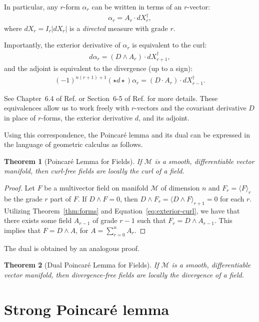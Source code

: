 \documentclass[twocolumn,notitlepage,nofootinbib,tightenlines]{revtex4-1}
\newtheorem{thm}{Theorem}[section]
\theoremstyle{definition}
\theoremstyle{remark}
\numberwithin{equation}{section}
\begin{document}
In particular, any $r$-form $\alpha_r$ can be written in terms of an $r$-vector:
%
\begin{align}\label{eq:form-field}
    \alpha_r = A_r \cdot dX_r^\dagger,
\end{align}
%
where $dX_r = I_r |dX_r|$ is a \emph{directed} measure with grade $r$.

Importantly, the exterior derivative of $\alpha_r$ is equivalent to the curl:
%
\begin{align}\label{eq:exterior-curl}
    d \alpha_r = (D \wedge A_r) \cdot dX_{r+1}^\dagger,
\end{align}
%
and the adjoint is equivalent to the divergence (up to a sign):
%
\begin{align}\label{eq:adjoint-divergence}
    (-1)^{n(r+1)+1}(\star d \star) \alpha_r = (D \cdot A_r) \cdot dX_{r-1}^\dagger.
\end{align}

See Chapter~6.4 of Ref. \cite{doran} or Section~6-5 of Ref. \cite{hestenes} for more details. These equivalences allow us to work freely with $r$-vectors and the covariant derivative $D$ in place of $r$-forms, the exterior derivative $d$, and its adjoint.

Using this correspondence, the Poincar\'e lemma and its dual can be expressed in the language of geometric calculus as follows.
%
\begin{thm}[Poincar\'e Lemma for Fields]\label{thm:fields}
    If $\mathcal{M}$ is a smooth, differentiable vector manifold, then curl-free fields are locally the curl of a field.
\end{thm}
%
\begin{proof}
  Let $F$ be a multivector field on manifold $\mathcal{M}$ of dimension $n$ and $F_r = \langle F \rangle_r$ be the grade $r$ part of $F$. If $D \wedge F = 0$, then $D \wedge F_{r} = \langle D \wedge F \rangle_{r+1} = 0$ for each $r$. Utilizing Theorem~\ref{thm:forms} and Equation~\ref{eq:exterior-curl}, we have that there exists some field $A_{r-1}$ of grade $r-1$ such that $F_r = D \wedge A_{r-1}$. This implies that $F = D \wedge A$, for $A = \sum_{r=0}^{n} A_{r}$.
\end{proof}
%
\noindent
The dual is obtained by an analogous proof.
%
\begin{thm}[Dual Poincar\'e Lemma for Fields]\label{thm:dual-fields}
    If $\mathcal{M}$ is a smooth, differentiable vector manifold, then divergence-free fields are locally the divergence of a field.
\end{thm}
%
\section{Strong Poincar\'e lemma}
\end{document}
